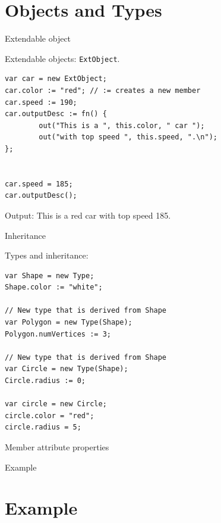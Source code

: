 \documentclass[ucs,9pt]{beamer}
\begin{document}
\section{Objects and Types}
\begin{frame}[fragile]{Extendable object}
	\begin{block}{Extendable objects:  \lstinline!ExtObject!.}
		\begin{lstlisting}
var car = new ExtObject;
car.color := "red"; // := creates a new member
car.speed := 190;
car.outputDesc := fn() {
		out("This is a ", this.color, " car ");
		out("with top speed ", this.speed, ".\n");
};


car.speed = 185;
car.outputDesc();
		\end{lstlisting}
	\end{block}
	Output: This is a red car with top speed 185.
\end{frame}

\begin{frame}[fragile]{Inheritance}
	\begin{block}{Types and inheritance:}
		\begin{lstlisting}
var Shape = new Type;
Shape.color := "white";

// New type that is derived from Shape
var Polygon = new Type(Shape); 
Polygon.numVertices := 3;

// New type that is derived from Shape
var Circle = new Type(Shape); 
Circle.radius := 0;

var circle = new Circle;
circle.color = "red";
circle.radius = 5;
		\end{lstlisting}
	\end{block}
\end{frame}
 
\begin{frame}{Member attribute properties}
	\begin{block}{Example}
		
	\end{block}
\end{frame}

\section{Example}
\end{document}
